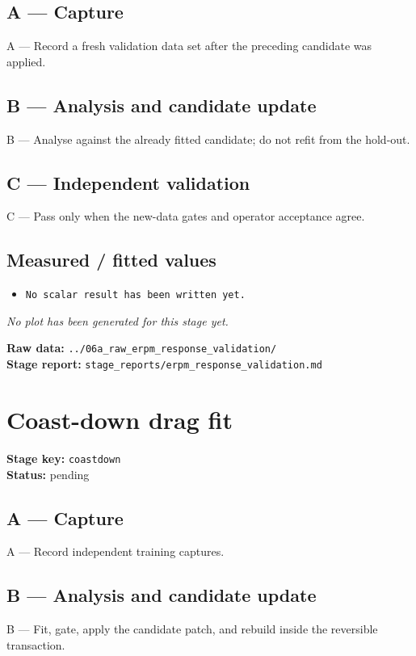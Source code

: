 \documentclass[11pt,a4paper]{article}
\begin{document}
\subsection*{A --- Capture}
A — Record a fresh validation data set after the preceding candidate was applied.

\subsection*{B --- Analysis and candidate update}
B — Analyse against the already fitted candidate; do not refit from the hold-out.

\subsection*{C --- Independent validation}
C — Pass only when the new-data gates and operator acceptance agree.

\subsection*{Measured / fitted values}
\begin{itemize}\setlength\itemsep{0pt}
\item \texttt{No scalar result has been written yet.}
\end{itemize}

\textit{No plot has been generated for this stage yet.}

\vfill
\textbf{Raw data:} \texttt{../06a\_raw\_erpm\_response\_validation/}\\
\textbf{Stage report:} \texttt{stage\_reports/erpm\_response\_validation.md}
\clearpage
\small
\section*{Coast-down drag fit}
\textbf{Stage key:} \texttt{coastdown}\\
\textbf{Status:} pending\\

\subsection*{A --- Capture}
A — Record independent training captures.

\subsection*{B --- Analysis and candidate update}
B — Fit, gate, apply the candidate patch, and rebuild inside the reversible transaction.
\end{document}
